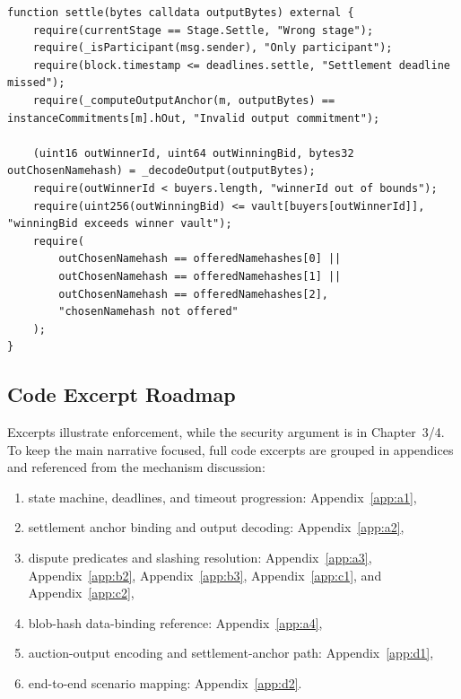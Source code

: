 \documentclass[final,twoside]{vutinfth}
\begin{document}
\begin{lstlisting}[style=soliditysnippet,caption={Settlement anchor binding and output-domain checks.},label={lst:settlement-binding}]
function settle(bytes calldata outputBytes) external {
    require(currentStage == Stage.Settle, "Wrong stage");
    require(_isParticipant(msg.sender), "Only participant");
    require(block.timestamp <= deadlines.settle, "Settlement deadline missed");
    require(_computeOutputAnchor(m, outputBytes) == instanceCommitments[m].hOut, "Invalid output commitment");

    (uint16 outWinnerId, uint64 outWinningBid, bytes32 outChosenNamehash) = _decodeOutput(outputBytes);
    require(outWinnerId < buyers.length, "winnerId out of bounds");
    require(uint256(outWinningBid) <= vault[buyers[outWinnerId]], "winningBid exceeds winner vault");
    require(
        outChosenNamehash == offeredNamehashes[0] ||
        outChosenNamehash == offeredNamehashes[1] ||
        outChosenNamehash == offeredNamehashes[2],
        "chosenNamehash not offered"
    );
}
\end{lstlisting}

\subsection{Code Excerpt Roadmap}
Excerpts illustrate enforcement, while the security argument is in Chapter~3/4.
To keep the main narrative focused, full code excerpts are grouped in appendices
and referenced from the mechanism discussion:
\begin{enumerate}
\item state machine, deadlines, and timeout progression:
Appendix~\ref{app:a1},
\item settlement anchor binding and output decoding:
Appendix~\ref{app:a2},
\item dispute predicates and slashing resolution:
Appendix~\ref{app:a3}, Appendix~\ref{app:b2}, Appendix~\ref{app:b3},
Appendix~\ref{app:c1}, and Appendix~\ref{app:c2},
\item blob-hash data-binding reference:
Appendix~\ref{app:a4},
\item auction-output encoding and settlement-anchor path:
Appendix~\ref{app:d1},
\item end-to-end scenario mapping:
Appendix~\ref{app:d2}.
\end{enumerate}
\end{document}
